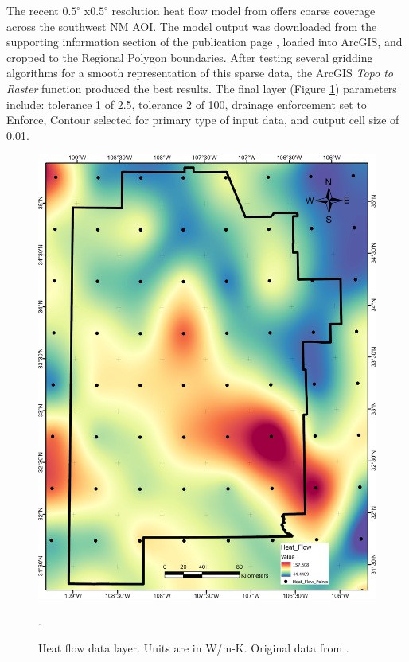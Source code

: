 The recent $0.5^\circ$ x$0.5^\circ$ resolution heat flow model from \citet{lucazeau_analysis_2019} offers coarse coverage across the southwest NM AOI. The model output was downloaded from the supporting information section of the publication page \citep{lucazeau_analysis_2019}, loaded into ArcGIS, and cropped to the Regional Polygon boundaries. After testing several gridding algorithms for a smooth representation of this sparse data, the ArcGIS \textit{Topo to Raster} function produced the best results. The final layer (Figure \ref{fig:feat_heatflow}) parameters include: tolerance 1 of 2.5, tolerance 2 of 100, drainage enforcement set to Enforce, Contour selected for primary type of input data, and output cell size of 0.01. 

\begin{figure}[!htp]
\centering
\includegraphics[scale=.50]{templates/images/Figure-HeatFlow.png}
\caption[Heat flow data layer]{Heat flow data layer. Units are in W/m-K. Original data from \protect\citep{lucazeau_analysis_2019}.}.
\label{fig:feat_heatflow}
\end{figure}


